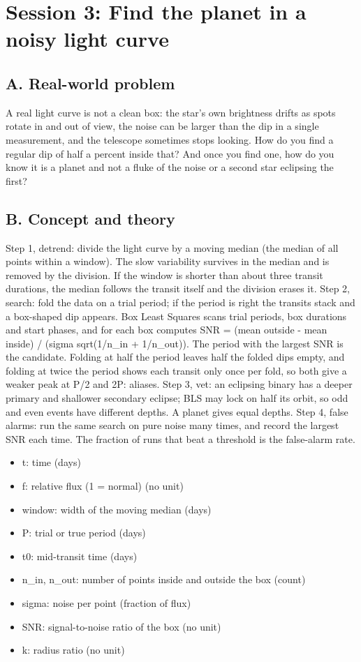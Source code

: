 \documentclass[11pt,a4paper]{article}
\begin{document}
\section{Session 3: Find the planet in a noisy light curve}

\subsection*{A. Real-world problem}
A real light curve is not a clean box: the star's own brightness drifts as spots rotate in and out of view, the noise can be larger than the dip in a single measurement, and the telescope sometimes stops looking. How do you find a regular dip of half a percent inside that? And once you find one, how do you know it is a planet and not a fluke of the noise or a second star eclipsing the first?

\subsection*{B. Concept and theory}
Step 1, detrend: divide the light curve by a moving median (the median of all points within a window). The slow variability survives in the median and is removed by the division. If the window is shorter than about three transit durations, the median follows the transit itself and the division erases it. Step 2, search: fold the data on a trial period; if the period is right the transits stack and a box-shaped dip appears. Box Least Squares scans trial periods, box durations and start phases, and for each box computes SNR = (mean outside - mean inside) / (sigma sqrt(1/n\_in + 1/n\_out)). The period with the largest SNR is the candidate. Folding at half the period leaves half the folded dips empty, and folding at twice the period shows each transit only once per fold, so both give a weaker peak at P/2 and 2P: aliases. Step 3, vet: an eclipsing binary has a deeper primary and shallower secondary eclipse; BLS may lock on half its orbit, so odd and even events have different depths. A planet gives equal depths. Step 4, false alarms: run the same search on pure noise many times, and record the largest SNR each time. The fraction of runs that beat a threshold is the false-alarm rate.

\begin{itemize}[nosep]
\item t: time (days)
\item f: relative flux (1 = normal) (no unit)
\item window: width of the moving median (days)
\item P: trial or true period (days)
\item t0: mid-transit time (days)
\item n\_in, n\_out: number of points inside and outside the box (count)
\item sigma: noise per point (fraction of flux)
\item SNR: signal-to-noise ratio of the box (no unit)
\item k: radius ratio (no unit)
\end{itemize}
\end{document}
